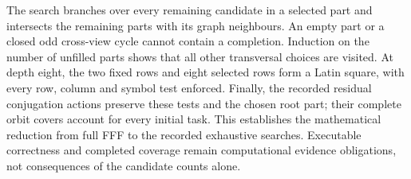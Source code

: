 The search branches over every remaining candidate in a selected part and
intersects the remaining parts with its graph neighbours.  An empty part
or a closed odd cross-view cycle cannot contain a completion.  Induction on
the number of unfilled parts shows that all other transversal choices are
visited.  At depth eight, the two fixed rows and eight selected rows form
a Latin square, with every row, column and symbol test enforced.  Finally,
the recorded residual conjugation actions preserve these tests and the
chosen root part; their complete orbit covers account for every initial
task.  This establishes the mathematical reduction from full FFF to the
recorded exhaustive searches.  Executable correctness and completed coverage
remain computational evidence obligations, not consequences of the
candidate counts alone.
